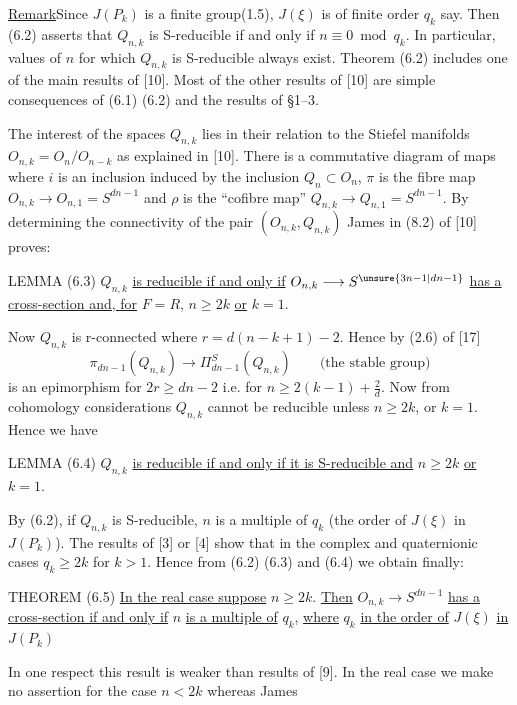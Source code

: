 \uline{Remark}\quad Since $J(P_k)$ is a finite group(1.5), $J(\xi)$ is of
finite order $q_k$ say. Then (6.2) asserts that $Q_{n,k}$ is S-reducible
if and only if $n\equiv0\bmod q_k$. In particular, values of $n$ for
which $Q_{n,k}$ is S-reducible always exist. Theorem (6.2) includes one
of the main results of [10]. Most of the other results of [10] are
simple consequences of (6.1) (6.2) and the results of \S1--3.

The interest of the spaces $Q_{n,k}$ lies in their relation to the
Stiefel manifolds $O_{n,k}=O_n/O_{n-k}$ as explained in [10]. There is
a commutative diagram of maps
where $i$ is an inclusion induced by the inclusion $Q_n\subset O_n$,
$\pi$ is the fibre map $O_{n,k}\longrightarrow O_{n,1}=S^{dn-1}$ and
$\rho$ is the ``cofibre map'' $Q_{n,k}\longrightarrow Q_{n,1}=S^{dn-1}$.
By determining the connectivity of the pair $(O_{n,k},Q_{n,k})$ James
in (8.2) of [10] proves:

LEMMA (6.3) $Q_{n,k}$ \uline{is reducible if and only if}
$O_{n,k}\longrightarrow S^{\unsure{3n-1|dn-1}}$ \uline{has a cross-section
and, for} $F=R$, $n\geq2k$ \uline{or} $k=1$.

Now $Q_{n,k}$ is r-connected where $r=d(n-k+1)-2$. Hence by (2.6) of [17]
\[
\pi_{dn-1}(Q_{n,k})\longrightarrow\Pi^S_{dn-1}(Q_{n,k})
\qquad\text{(the stable group)}
\]
is an epimorphism for $2r\geq dn-2$ i.e. for
$n\geq2(k-1)+\frac2d$. Now from cohomology considerations $Q_{n,k}$
cannot be reducible unless $n\geq2k$, or $k=1$. Hence we have

LEMMA (6.4) $Q_{n,k}$ \uline{is reducible if and only if it is
S-reducible and} $n\geq2k$ \uline{or} $k=1$.

By (6.2), if $Q_{n,k}$ is S-reducible, $n$ is a multiple of $q_k$
(the order of $J(\xi)$ in $J(P_k)$). The results of [3] or [4] show that
in the complex and quaternionic cases $q_k\geq2k$ for $k>1$. Hence from
(6.2) (6.3) and (6.4) we obtain finally:

THEOREM (6.5) \uline{In the real case suppose} $n\geq2k$. \uline{Then}
$O_{n,k}\longrightarrow S^{dn-1}$ \uline{has a cross-section if and
only if} $n$ \uline{is a multiple of} $q_k$, \uline{where} $q_k$
\uline{in the order of} $J(\xi)$ \uline{in} $J(P_k)$

In one respect this result is weaker than results of [9]. In the real
case we make no assertion for the case $n<2k$ whereas James

